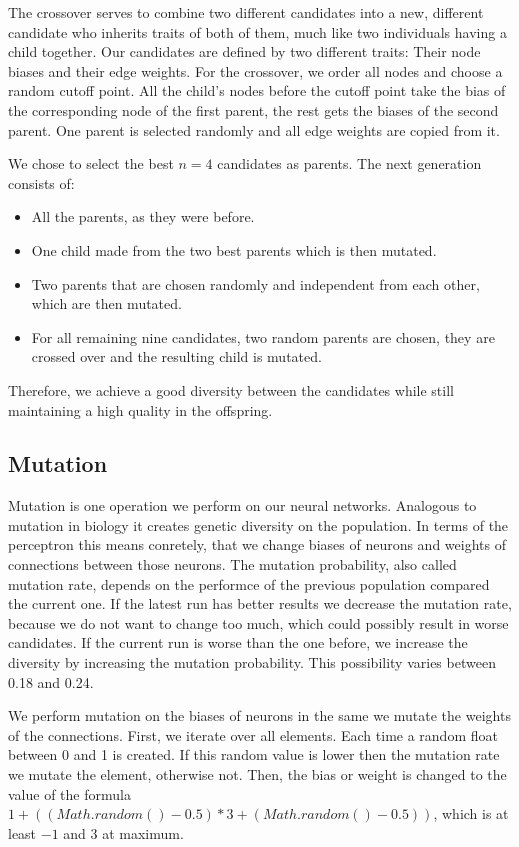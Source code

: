 \documentclass[a4paper,12pt,pagesize,headsepline,bibtotoc,titlepage,abstracton]{scrartcl}
\begin{document}
The crossover serves to combine two different candidates into a new, different candidate who inherits traits of both of them, much like two individuals having a child together. Our candidates are defined by two different traits: Their node biases and their edge weights. For the crossover, we order all nodes and choose a random cutoff point. All the child's nodes before the cutoff point take the bias of the corresponding node of the first parent, the rest gets the biases of the second parent. One parent is selected randomly and all edge weights are copied from it.

We chose to select the best $n=4$ candidates as parents. The next generation consists of:

\begin{itemize}
\item All the parents, as they were before.
\item One child made from the two best parents which is then mutated.
\item Two parents that are chosen randomly and independent from each other, which are then mutated.
\item For all remaining nine candidates, two random parents are chosen, they are crossed over and the resulting child is mutated.
\end{itemize}

Therefore, we achieve a good diversity between the candidates while still maintaining a high quality in the offspring.

\subsection{Mutation}

Mutation is one operation we perform on our neural networks. Analogous to mutation in biology it creates genetic diversity on the population. In terms of the perceptron this means conretely, that we change biases of neurons and weights of connections between those neurons. The mutation probability, also called mutation rate, depends on the performce of the previous population compared the current one. If the latest run has better results we decrease the mutation rate, because we do not want to change too much, which could possibly result in worse candidates. If the current run is worse than the one before, we increase the diversity by increasing the mutation probability. This possibility varies between 0.18 and 0.24.

We perform mutation on the biases of neurons in the same we mutate the weights of the connections. First, we iterate over all elements. Each time a random float between 0 and 1 is created. If this random value is lower then the mutation rate we mutate the element, otherwise not. Then, the bias or weight is changed to the value of the formula $1 + ((Math.random() - 0.5) * 3 + (Math.random() - 0.5))$, which is at least $-1$ and $3$ at maximum.
\end{document}
